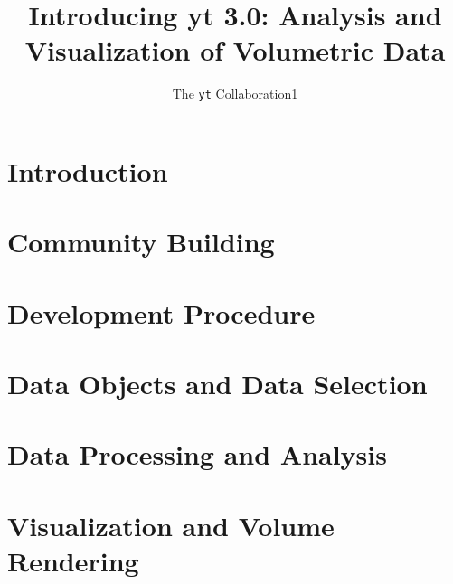 \documentclass{emulateapj}
\newcommand{\yt}{\texttt{yt}}
\begin{document}
\title{Introducing yt 3.0: Analysis and Visualization of Volumetric Data}
\author{The \yt{} Collaboration{1}}
\email{}

\begin{abstract}
\end{abstract}

\keywords{}


\maketitle


\section{Introduction}


\section{Community Building}


\section{Development Procedure}


\section{Data Objects and Data Selection}


\section{Data Processing and Analysis}


\section{Visualization and Volume Rendering}

\end{document}

